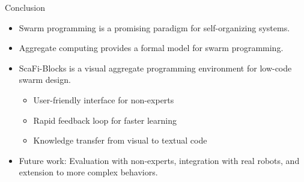 \documentclass[aspectratio=169]{beamer}
\begin{document}
\begin{frame}{Conclusion}
\begin{itemize}
	\item \alert{Swarm programming} is a promising paradigm for self-organizing systems.
	\item \alert{Aggregate computing} provides a formal model for swarm programming.
	\item \alert{ScaFi-Blocks} is a visual aggregate programming environment for low-code swarm design.
	\begin{itemize}
		\item \alert{User-friendly interface} for non-experts
		\item \alert{Rapid feedback loop} for faster learning
		\item \alert{Knowledge transfer} from visual to textual code
	\end{itemize}
	\item \alert{Future work:} Evaluation with non-experts, integration with real robots, and extension to more complex behaviors.
\end{itemize}
\end{frame}
\end{document}
